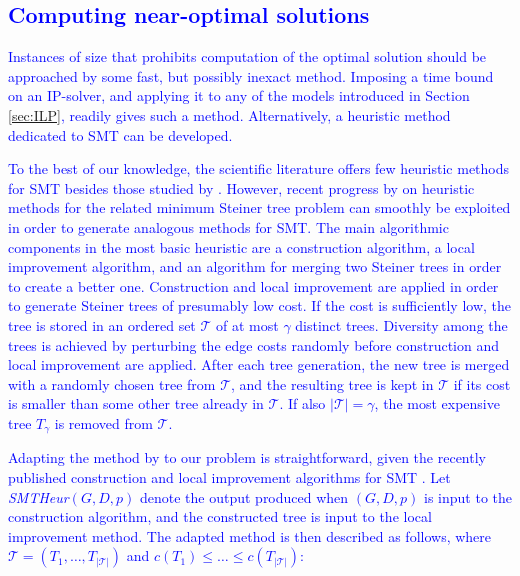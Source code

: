 \textcolor{blue}{\section{Computing near-optimal solutions} \label{sec:heur}}

\textcolor{blue}{
Instances of size that prohibits computation of the optimal solution should be approached by some fast, but possibly inexact method.
Imposing a time bound on an IP-solver, and applying it to any of the models introduced in Section \ref{sec:ILP}, readily gives such a method.
Alternatively, a heuristic method dedicated to SMT can be developed.}

\textcolor{blue}{
To the best of our knowledge, the scientific literature offers few heuristic methods for SMT besides those studied by \citet{ivanova16isco}.
However, recent progress by \citet{pajor18} on heuristic methods for the related minimum Steiner tree problem can smoothly be exploited in order to generate analogous methods for SMT.
The main algorithmic components in the most basic heuristic are a construction algorithm, a local improvement algorithm,
and an algorithm for merging two Steiner trees in order to create a better one.
Construction and local improvement are applied in order to generate Steiner trees of presumably low cost.
If the cost is sufficiently low, the tree is stored in an ordered set $\mathcal{T}$ of at most $\gamma$ distinct trees.
Diversity among the trees is achieved by perturbing the edge costs randomly before construction and local improvement are applied.
After each tree generation, the new tree is merged with a randomly chosen tree from $\mathcal{T}$, 
and the resulting tree is kept in $\mathcal{T}$ if its cost is smaller than some other tree already in $\mathcal{T}$.
If also $|\mathcal{T}|=\gamma$, the most expensive tree $T_{\gamma}$ is removed from $\mathcal{T}$.
}

\textcolor{blue}{
Adapting the method by \citet{pajor18} to our problem is straightforward,
given the recently published construction and local improvement algorithms for SMT \citep{ivanova16isco}.
Let \textit{SMTHeur}$(G,D,p)$ denote the output produced when $(G,D,p)$ is input to the construction algorithm,
and the constructed tree is input to the local improvement method.
The adapted method is then described as follows, where $\mathcal{T}=\left(T_1,\ldots,T_{|\mathcal{T}|}\right)$
and $c\left(T_1\right)\leq\dots\leq c\left(T_{|\mathcal{T}|}\right)$:}

